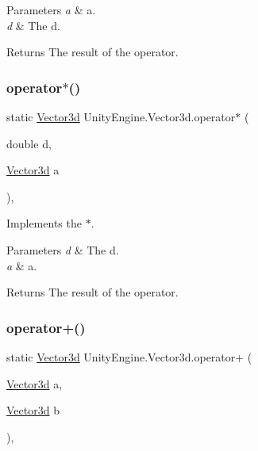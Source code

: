 \begin{DoxyParams}{Parameters}
{\em a} & a.\\
\hline
{\em d} & The d.\\
\hline
\end{DoxyParams}
\begin{DoxyReturn}{Returns}
The result of the operator.
\end{DoxyReturn}
\mbox{\label{struct_unity_engine_1_1_vector3d_a41bbe6bedd730d92560d0cbcb6c6fd16}} 
\subsubsection{\texorpdfstring{operator$\ast$()}{operator*()}\hspace{0.1cm}{\footnotesize\ttfamily [2/2]}}
{\footnotesize\ttfamily static \hyperlink{struct_unity_engine_1_1_vector3d}{Vector3d} Unity\+Engine.\+Vector3d.\+operator$\ast$ (\begin{DoxyParamCaption}\item[{double}]{d,  }\item[{\hyperlink{struct_unity_engine_1_1_vector3d}{Vector3d}}]{a }\end{DoxyParamCaption})\hspace{0.3cm}{\ttfamily [inline]}, {\ttfamily [static]}}



Implements the $\ast$. 


\begin{DoxyParams}{Parameters}
{\em d} & The d.\\
\hline
{\em a} & a.\\
\hline
\end{DoxyParams}
\begin{DoxyReturn}{Returns}
The result of the operator.
\end{DoxyReturn}
\mbox{\label{struct_unity_engine_1_1_vector3d_af39f26741114eb1a2bc568575e023aff}} 
\subsubsection{\texorpdfstring{operator+()}{operator+()}}
{\footnotesize\ttfamily static \hyperlink{struct_unity_engine_1_1_vector3d}{Vector3d} Unity\+Engine.\+Vector3d.\+operator+ (\begin{DoxyParamCaption}\item[{\hyperlink{struct_unity_engine_1_1_vector3d}{Vector3d}}]{a,  }\item[{\hyperlink{struct_unity_engine_1_1_vector3d}{Vector3d}}]{b }\end{DoxyParamCaption})\hspace{0.3cm}{\ttfamily [inline]}, {\ttfamily [static]}}



